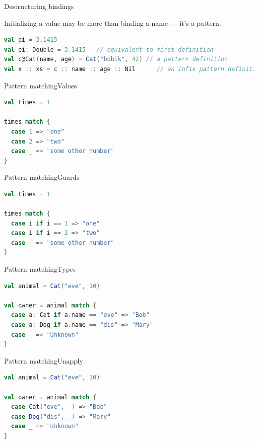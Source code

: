 \documentclass[aspectratio=169]{beamer}
\begin{document}
\begin{frame}[fragile]{Destructuring bindings}
  \begin{block}{}
    Initializing a value may be more than binding a name --- it's a pattern.
  \end{block}
  \vspace{2em}
  \pause
\begin{lstlisting}[style=scala,language=scala]
val pi = 3.1415
val pi: Double = 3.1415   // equivalent to first definition
val c@Cat(name, age) = Cat("bobik", 42) // a pattern definition
val x :: xs = c :: name :: age :: Nil      // an infix pattern definition
\end{lstlisting}
\end{frame}

\begin{frame}[fragile]{Pattern matching}{Values}
\begin{lstlisting}[style=scala,language=scala]
val times = 1

times match {
  case 1 => "one"
  case 2 => "two"
  case _ => "some other number"
}
\end{lstlisting}
\end{frame}

\begin{frame}[fragile]{Pattern matching}{Guards}
\begin{lstlisting}[style=scala,language=scala]
val times = 1

times match {
  case i if i == 1 => "one"
  case i if i == 2 => "two"
  case _ => "some other number"
}
\end{lstlisting}
\end{frame}

\begin{frame}[fragile]{Pattern matching}{Types}
\begin{lstlisting}[style=scala,language=scala]
val animal = Cat("eve", 10)

val owner = animal match {
  case a: Cat if a.name == "eve" => "Bob"
  case a: Dog if a.name == "dis" => "Mary"
  case _ => "Unknown"
}
\end{lstlisting}
\end{frame}

\begin{frame}[fragile]{Pattern matching}{Unapply}
\begin{lstlisting}[style=scala,language=scala]
val animal = Cat("eve", 10)

val owner = animal match {
  case Cat("eve", _) => "Bob"
  case Dog("dis", _) => "Mary"
  case _ => "Unknown"
}
\end{lstlisting}
\end{frame}
\end{document}
